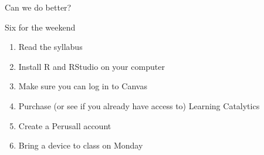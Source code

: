 \documentclass{beamer}\usepackage[]{graphicx}\usepackage[]{color}
\newenvironment{knitrout}{}{} %
\begin{document}
\begin{darkframes}
\begin{frame}{Can we do better?}
\begin{knitrout}


\end{knitrout}
    \end{frame}

    \begin{frame}{Six for the weekend}
      \begin{enumerate}
        \item Read the syllabus
        \item Install R and RStudio on your computer
        \item Make sure you can log in to Canvas
        \item Purchase (or see if you already have access to) Learning Catalytics
        \item Create a Perusall account
        \item Bring a device to class on Monday
      \end{enumerate}
    \end{frame}


  \end{darkframes}
\end{document}
